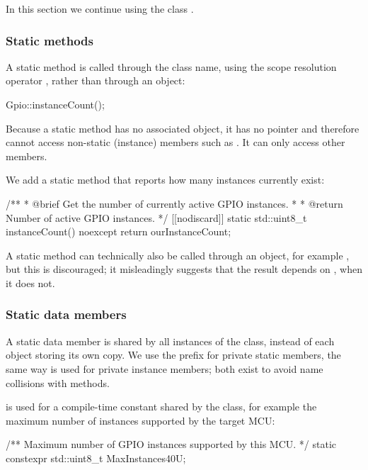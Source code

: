 In this section we continue using the class .

\subsubsection{Static methods}
A static method is called through the class name, using the scope resolution operator \code{::},
rather than through an object:

\begin{cppcode}
Gpio::instanceCount();
\end{cppcode}

\noindent Because a static method has no associated object, it has no  pointer and
therefore cannot access non-static (instance) members such as . It can only access
other  members.

We add a static method  that reports how many  instances currently
exist:

\begin{cppcode}
/**
 * @brief Get the number of currently active GPIO instances.
 *
 * @return Number of active GPIO instances.
 */
[[nodiscard]] static std::uint8_t instanceCount() noexcept { return ourInstanceCount; }
\end{cppcode}

\note A static method can technically also be called through an object, for example
, but this is discouraged; it misleadingly suggests that the result
depends on , when it does not.

\subsubsection{Static data members}
A static data member is shared by all instances of the class, instead of each object storing its
own copy. We use the prefix  for private static members, the same way  is used
for private instance members; both exist to avoid name collisions with methods.

\textbf{} is used for a compile-time constant shared by the class, for
example the maximum number of  instances supported by the target MCU:

\begin{cppcode}
/** Maximum number of GPIO instances supported by this MCU. */
static constexpr std::uint8_t MaxInstances{40U};
\end{cppcode}

